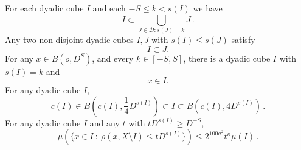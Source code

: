 For each dyadic cube $I$  and each $-S\le k<s(I)$ we have
\begin{equation}\label{coverdyadic}
I\subset \bigcup_{J\in \mathcal {D}: s(J)=k}J\, .
\end{equation}
Any two non-disjoint dyadic cubes  $I,J$ with $s(I)\le s(J)$ satisfy
\begin{equation}\label{dyadicproperty}
I\subset J.
\end{equation}
For any $x\in B(o,D^S)$, and every $k\in[-S,S]$, there
is a dyadic cube $I$ with $s(I)=k$ and
\begin{equation}\label{coverball}
x\in I.
\end{equation}
For any dyadic cube $I$,
 \begin{equation}
        \label{eq vol sp cube}
        c(I)\in B(c(I), \frac{1}{4} D^{s(I)}) \subset I \subset B(c(I), 4 D^{s(I)})\,.
    \end{equation}
For any dyadic cube  $I$ and any $t$ with $tD^{s(I)} \ge D^{-S}$,
\begin{equation}
        \label{eq small boundary}
        \mu(\{x \in I \ : \ \rho(x, X \setminus I) \leq t D^{s(I)}\}) \le 2^{100a^2} t^\kappa \mu(I)\,.
    \end{equation}







